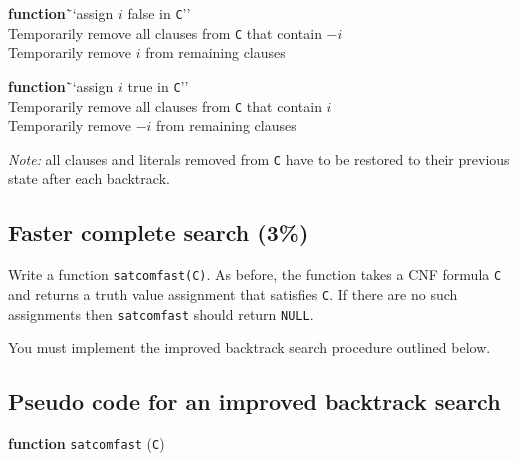 \documentclass[12pt]{article}
\begin{document}
\vspace*{1ex}

\begin{tabbing}
{\bf function}\= ``assign $i$ false in {\tt C}''
\\
\> Temporarily remove all clauses from {\tt C} that contain $-i$
\\
\> Temporarily remove $i$ from remaining clauses
\end{tabbing}

\vspace*{1ex}

\begin{tabbing}
{\bf function}\= ``assign $i$ true in {\tt C}''
\\
\> Temporarily remove all clauses from {\tt C} that contain $i$
\\
\> Temporarily remove $-i$ from remaining clauses
\end{tabbing}

\bigskip

\noindent
{\em Note:}\/ all clauses and literals removed from {\tt C}
have to be restored to their previous state after each
backtrack.

\vspace*{1.75\baselineskip}


\newpage

\subsection{Faster complete search \rm(3\%)}
Write a function {\tt satcomfast(C)}.
%
As before,
the function takes a CNF formula {\tt C} 
and returns a truth value assignment
that satisfies {\tt C}.
If there are no such assignments then {\tt satcomfast} 
should return {\tt NULL}.

You must implement the improved backtrack search procedure outlined below.

\subsection*{Pseudo code for an improved backtrack search}

\vspace*{1ex}

\begin{tabbing}
{\bf function} {\tt satcomfast} ({\tt C})
\end{tabbing}
\end{document}
